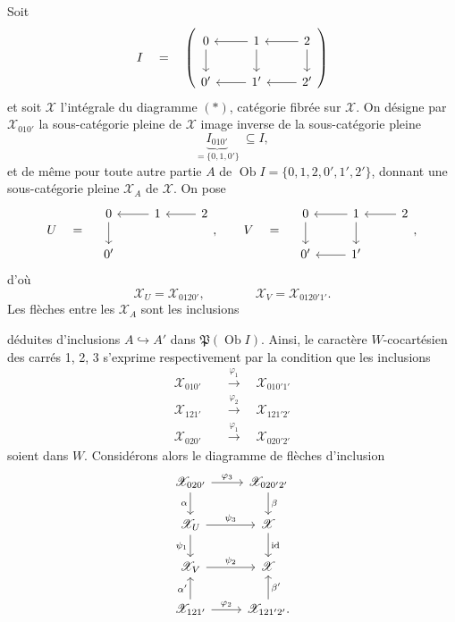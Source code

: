 \documentclass[11pt]{article}
\newcommand{\printedpage}[1]{\marginpar{\footnotesize p.~#1}}
\newcommand{\msp}[1]{\marginpar{\footnotesize [#1]}}
\newcommand{\cX}{\mathscr{X}}
\newcommand{\Ob}{\operatorname{Ob}}
\begin{document}
Soit
\[
I \quad = \quad
\left(
\begin{tikzcd}[ampersand replacement=\&]
0 \arrow[d] \& 1 \arrow[l] \arrow[d] \& 2 \arrow[l] \arrow[d] \\
0' \& 1' \arrow[l] \& 2' \arrow[l]
\end{tikzcd}
\right)
\]
et soit $\cX$ l'intégrale du diagramme $(\ast)$, catégorie fibrée sur $\cX$. On désigne par $\cX_{010'}$ la sous-catégorie pleine de $\cX$ image inverse de la sous-catégorie pleine %
\[
\underbrace{I_{010'}}_{=\{0,1,0'\}} \ \subseteq I,
\]
et de même pour toute autre partie $A$ de $\Ob I = \{0,1,2,0',1',2'\}$, donnant une sous-catégorie pleine $\cX_A$ de $\cX$. On pose
\[
U \quad = \quad
\begin{tikzcd}[ampersand replacement=\&]
0 \arrow[d] \& 1 \arrow[l] \& 2 \arrow[l] \\
0' \& \&
\end{tikzcd}
, \qquad
V \quad = \quad
\begin{tikzcd}[ampersand replacement=\&]
0 \arrow[d] \& 1 \arrow[l] \arrow[d] \& 2 \arrow[l] \\
0' \& 1' \arrow[l] \&
\end{tikzcd}
,
\]
d'où
\[
\cX_U = \cX_{0120'}, \qquad\qquad \cX_V = \cX_{0120'1'}.
\]
Les flèches entre les $\cX_A$ sont les inclusions

\msp{page 237}

déduites d'inclusions $A \hookrightarrow A'$ dans $\mathfrak{P}(\Ob I)$. Ainsi, le caractère $W$-cocartésien des carrés 1, 2, 3 s'exprime respectivement par la condition que les inclusions
\[
\begin{aligned}
\cX_{010'} \quad &\xrightarrow{\varphi_1} \quad \cX_{010'1'} \\
\cX_{121'} \quad &\xrightarrow{\varphi_2} \quad \cX_{121'2'} \\
\cX_{020'} \quad &\xrightarrow{\varphi_1} \quad \cX_{020'2'} %
\end{aligned}
\]
soient dans $W$. Considérons alors le diagramme de flèches d'inclusion
\printedpage{153}
\[
\begin{tikzcd}[ampersand replacement=\&]
\cX_{020'} \arrow[r, "\varphi_3"] \arrow[d, "\alpha"'] \& \cX_{020'2'} \arrow[d, "\beta"] \\
\cX_U \arrow[r, "\psi_3"] \arrow[d, "\psi_1"'] \& \cX \arrow[d, "\mathrm{id}"] \\
\cX_V \arrow[r, "\psi_2"] \& \cX \\
\cX_{121'} \arrow[r, "\varphi_2"] \arrow[u, "\alpha'"] \& \cX_{121'2'}. \arrow[u, "\beta'"']
\end{tikzcd}
\]
\end{document}
